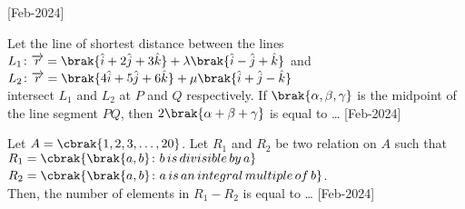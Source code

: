     \hfill{[Feb-2024]}
    \item Let the line of shortest distance between the lines\\
            $L_1\colon\overrightarrow{r}=\brak{\hat{i}+2\hat{j}+3\hat{k}}+\lambda\brak{\hat{i}-\hat{j}+\hat{k}}$ and \\
            $L_2\colon\overrightarrow{r}=\brak{4\hat{i}+5\hat{j}+6\hat{k}}+\mu\brak{\hat{i}+\hat{j}-\hat{k}}$\\
            intersect $L_1$ and $L_2$ at $P$ and $Q$ respectively. If $\brak{\alpha,\beta,\gamma}$ is the midpoint of the line segment $PQ$, then $2\brak{\alpha+\beta+\gamma}$ is equal to \dots
            \hfill{[Feb-2024]}
    \item Let $A=\cbrak{1,2,3,\dots,20}$. Let $R_1$ and $R_2$ be two relation on $A$ such that\\
        $R_1=\cbrak{\brak{a,b}\colon b\,is\,divisible\,by\,a}$\\
        $R_2=\cbrak{\brak{a,b}\colon a\,is\,an\,integral\,multiple\,of\,b}$.\\
        Then, the number of elements in $R_1-R_2$ is equal to \dots
        \hfill{[Feb-2024]}
